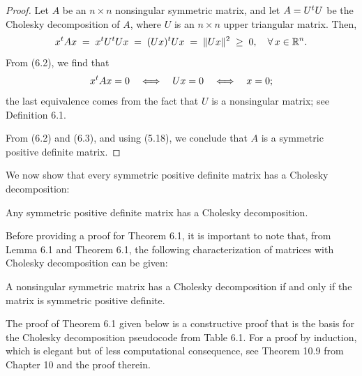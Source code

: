 \begin{proof}
Let $A$ be an $n \times n$ nonsingular symmetric matrix, and let $A = U^{t} U$ be the
Cholesky decomposition of $A$, where $U$ is an $n \times n$ upper triangular matrix.
Then,
\begin{equation}
x^{t} Ax \;=\; x^{t} U^{t} Ux \;=\; (Ux)^{t} Ux \;=\; \|Ux\|^2 \;\geq\; 0, \quad \forall\, x
\in \mathbb{R}^n.
\end{equation}
From (6.2), we find that
\begin{equation}
x^{t} Ax = 0 \quad \Longleftrightarrow \quad Ux = 0 \quad \Longleftrightarrow \quad x =
0;
\end{equation}
the last equivalence comes from the fact that $U$ is a nonsingular matrix; see
Definition 6.1.

From (6.2) and (6.3), and using (5.18), we conclude that $A$ is a symmetric positive
definite matrix.
\end{proof}

We now show that every symmetric positive definite matrix has a Cholesky decomposition:

\begin{theorem}
Any symmetric positive definite matrix has a Cholesky decomposition.
\end{theorem}

Before providing a proof for Theorem 6.1, it is important to note that, from Lemma 6.1
and Theorem 6.1, the following characterization of matrices with Cholesky decomposition
can be given:

\begin{theorem}
A nonsingular symmetric matrix has a Cholesky decomposition if and only if the matrix is
symmetric positive definite.
\end{theorem}

The proof of Theorem 6.1 given below is a constructive proof that is the basis for the
Cholesky decomposition pseudocode from Table 6.1. For a proof by induction, which is
elegant but of less computational consequence, see Theorem 10.9 from Chapter 10 and the
proof therein.

